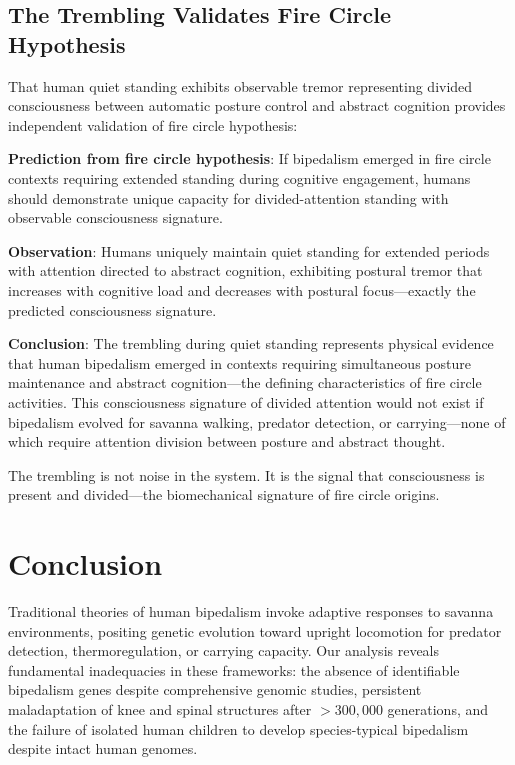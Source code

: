 \documentclass[12pt,a4paper]{article}
\begin{document}
\subsection{The Trembling Validates Fire Circle Hypothesis}

That human quiet standing exhibits observable tremor representing divided consciousness between automatic posture control and abstract cognition provides independent validation of fire circle hypothesis:

\textbf{Prediction from fire circle hypothesis}: If bipedalism emerged in fire circle contexts requiring extended standing during cognitive engagement, humans should demonstrate unique capacity for divided-attention standing with observable consciousness signature.

\textbf{Observation}: Humans uniquely maintain quiet standing for extended periods with attention directed to abstract cognition, exhibiting postural tremor that increases with cognitive load and decreases with postural focus—exactly the predicted consciousness signature.

\textbf{Conclusion}: The trembling during quiet standing represents physical evidence that human bipedalism emerged in contexts requiring simultaneous posture maintenance and abstract cognition—the defining characteristics of fire circle activities. This consciousness signature of divided attention would not exist if bipedalism evolved for savanna walking, predator detection, or carrying—none of which require attention division between posture and abstract thought.

The trembling is not noise in the system. It is the signal that consciousness is present and divided—the biomechanical signature of fire circle origins.

\section{Conclusion}

Traditional theories of human bipedalism invoke adaptive responses to savanna environments, positing genetic evolution toward upright locomotion for predator detection, thermoregulation, or carrying capacity. Our analysis reveals fundamental inadequacies in these frameworks: the absence of identifiable bipedalism genes despite comprehensive genomic studies, persistent maladaptation of knee and spinal structures after $>300,000$ generations, and the failure of isolated human children to develop species-typical bipedalism despite intact human genomes.
\end{document}
